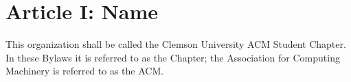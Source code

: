 \section*{Article I: Name}

This organization shall be called the Clemson University ACM Student Chapter.
In these Bylaws it is referred to as the Chapter; the Association for Computing Machinery is referred to as the ACM.
